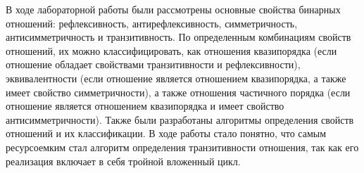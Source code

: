 \documentclass[bachelor, och, labwork]{shiza}
\begin{document}



\conclusion
В ходе лабораторной работы были рассмотрены основные свойства бинарных отношений:
рефлексивность, антирефлексивность, симметричность, антисимметричность и 
транзитивность. По определенным комбинациям свойств отношений, их можно 
классифицировать, как отношения квазипорядка (если отношение обладает 
свойствами транзитивности и рефлексивности), эквивалентности (если отношение 
является отношением квазипорядка, а также имеет свойство симметричности), а 
также отношения частичного порядка (если отношение является отношением 
квазипорядка и имеет свойство антисимметричности). Также были разработаны 
алгоритмы определения свойств отношений и их классификации. В ходе работы стало 
понятно, что самым ресурсоемким стал алгоритм определения транзитивности 
отношения, так как его реализация включает в себя тройной вложенный цикл.
\end{document}

